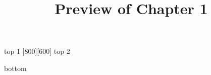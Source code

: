 \documentclass{ximera}
\title{Preview of Chapter 1}
\begin{document}
\begin{abstract}
\end{abstract}

\maketitle



top 1
[800][600]
top 2

\begin{expandable}

\end{expandable}






bottom
\end{document}
